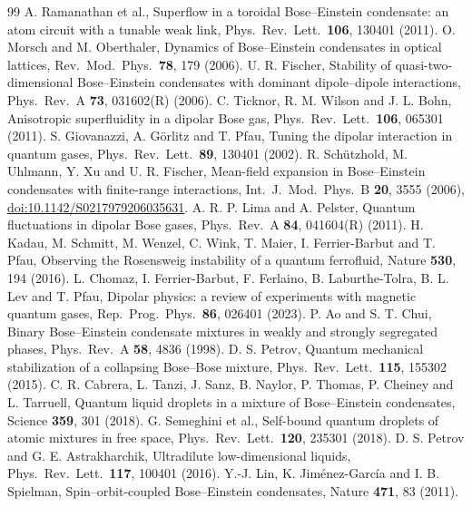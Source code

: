 \documentclass[11pt,a4paper]{article}
\begin{document}
\begin{thebibliography}{99}
 A. Ramanathan et al., Superflow in a toroidal Bose--Einstein condensate: an atom circuit with a tunable weak link, Phys.\ Rev.\ Lett.\ \textbf{106}, 130401 (2011).
 O. Morsch and M. Oberthaler, Dynamics of Bose--Einstein condensates in optical lattices, Rev.\ Mod.\ Phys.\ \textbf{78}, 179 (2006).
 U. R. Fischer, Stability of quasi-two-dimensional Bose--Einstein condensates with dominant dipole--dipole interactions, Phys.\ Rev.\ A \textbf{73}, 031602(R) (2006).
 C. Ticknor, R. M. Wilson and J. L. Bohn, Anisotropic superfluidity in a dipolar Bose gas, Phys.\ Rev.\ Lett.\ \textbf{106}, 065301 (2011).
 S. Giovanazzi, A. G\"orlitz and T. Pfau, Tuning the dipolar interaction in quantum gases, Phys.\ Rev.\ Lett.\ \textbf{89}, 130401 (2002).
 R. Sch\"utzhold, M. Uhlmann, Y. Xu and U. R. Fischer, Mean-field expansion in Bose--Einstein condensates with finite-range interactions, Int.\ J.\ Mod.\ Phys.\ B \textbf{20}, 3555 (2006), \href{https://doi.org/10.1142/S0217979206035631}{doi:10.1142/S0217979206035631}.
 A. R. P. Lima and A. Pelster, Quantum fluctuations in dipolar Bose gases, Phys.\ Rev.\ A \textbf{84}, 041604(R) (2011).
 H. Kadau, M. Schmitt, M. Wenzel, C. Wink, T. Maier, I. Ferrier-Barbut and T. Pfau, Observing the Rosensweig instability of a quantum ferrofluid, Nature \textbf{530}, 194 (2016).
 L. Chomaz, I. Ferrier-Barbut, F. Ferlaino, B. Laburthe-Tolra, B. L. Lev and T. Pfau, Dipolar physics: a review of experiments with magnetic quantum gases, Rep.\ Prog.\ Phys.\ \textbf{86}, 026401 (2023).
 P. Ao and S. T. Chui, Binary Bose--Einstein condensate mixtures in weakly and strongly segregated phases, Phys.\ Rev.\ A \textbf{58}, 4836 (1998).
 D. S. Petrov, Quantum mechanical stabilization of a collapsing Bose--Bose mixture, Phys.\ Rev.\ Lett.\ \textbf{115}, 155302 (2015).
 C. R. Cabrera, L. Tanzi, J. Sanz, B. Naylor, P. Thomas, P. Cheiney and L. Tarruell, Quantum liquid droplets in a mixture of Bose--Einstein condensates, Science \textbf{359}, 301 (2018).
 G. Semeghini et al., Self-bound quantum droplets of atomic mixtures in free space, Phys.\ Rev.\ Lett.\ \textbf{120}, 235301 (2018).
 D. S. Petrov and G. E. Astrakharchik, Ultradilute low-dimensional liquids, Phys.\ Rev.\ Lett.\ \textbf{117}, 100401 (2016).
 Y.-J. Lin, K. Jim\'enez-Garc\'ia and I. B. Spielman, Spin--orbit-coupled Bose--Einstein condensates, Nature \textbf{471}, 83 (2011).

\end{thebibliography}
\end{document}
